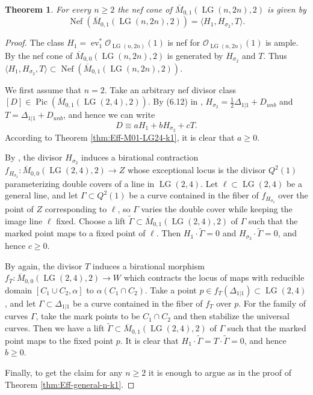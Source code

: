 \documentclass[10pt]{amsart}
\newtheorem{theorem}{Theorem}[section]
\theoremstyle{definition}
\newcommand{\OO}{\mathcal{O}}
\newcommand{\Pic}{\operatorname{Pic}}
\newcommand{\Nef}{\operatorname{Nef}}
\newcommand{\LG}{\operatorname{LG}}
\newcommand{\ev}{\operatorname{ev}}
\theoremstyle{plain} %
\begin{document}
\begin{theorem}\label{thm:nef-pointed-conics-LG}
For every $n\ge 2$ the nef cone of $\overline{M}_{0,1}(\LG(n,2n),2)$ is given by
\[
\operatorname{Nef}(\overline{M}_{0,1}(\LG(n,2n),2))
=
\langle H_1, H_{\sigma_2}, T\rangle.
\]
\end{theorem}
\begin{proof}
The class $H_1=\ev_1^*\OO_{\LG(n,2n)}(1)$ is nef for $\OO_{\LG(n,2n)}(1)$ is ample. By \cite[Proposition~6.11]{CM} the nef cone of $\overline{M}_{0,0}(\LG(n,2n),2)$ is generated by $H_{\sigma_2}$ and $T$. Thus $\langle H_1, H_{\sigma_2}, T\rangle \subset \Nef(\overline{M}_{0,1}(\LG(n,2n),2))$. 


We first assume that $n = 2$. Take an arbitrary nef divisor class $[D]\in\Pic(\overline{M}_{0,1}(\LG(2,4),2))$. By (6.12)
in \cite{CM}, $H_{\sigma_2}=\frac{1}{2}\Delta_{1|1}+D_{unb}$ and $T=\Delta_{1|1}+D_{unb}$, and hence we can write 
\begin{equation*}
    D\equiv aH_1+bH_{\sigma_2}+cT.
\end{equation*}
According to Theorem \ref{thm:Eff-M01-LG24-k1}, it is clear that $a\geq 0$.


By \cite[Proposition~6.11]{CM}, the divisor $H_{\sigma_2}$ induces a birational contraction $f_{H_{\sigma_2}}\colon\overline{M}_{0,0}(\LG(2,4),2)\rightarrow Z$ whose exceptional locus is the divisor $Q^2(1)$ parameterizing double covers of a line in $\LG(2,4)$.
Let $\ell\subset \LG(2,4)$ be a general line, and let $\Gamma\subset Q^2(1)$ be a curve contained in the fiber of
$f_{H_{\sigma_2}}$ over the point of $Z$ corresponding to $\ell$, so $\Gamma$ varies the double cover while keeping
the image line $\ell$ fixed. Choose a lift $\widetilde{\Gamma}\subset \overline{M}_{0,1}(\LG(2,4),2)$ of $\Gamma$ such that the marked point
maps to a fixed point of $\ell$. Then $H_1\cdot \widetilde{\Gamma}=0$ and $H_{\sigma_2}\cdot \widetilde{\Gamma}=0$, and hence $c\geq0$.

By \cite[Proposition~6.11]{CM} again, the divisor $T$ induces a birational morphism $f_{T}\colon\overline{M}_{0,0}(\LG(2,4),2)\rightarrow W$ which contracts the locus of maps with reducible 
domain $[C_1\cup C_2, \alpha]$ to $\alpha(C_1\cap C_2)$.
Take a point $p\in f_T(\Delta_{1|1})\subset \LG(2,4)$, and let $\Gamma\subset\Delta_{1|1}$ be a curve contained in the fiber of
$f_T$ over $p$. For the family of curves $\Gamma$,
take the mark points to be $C_1\cap C_2$ and then stabilize the universal curves. Then we have a lift $\widetilde{\Gamma}\subset \overline{M}_{0,1}(\LG(2,4),2)$ of $\Gamma$ such that the marked point
maps to the fixed point  $p$. It is clear that $H_1\cdot \widetilde{\Gamma}=T\cdot \widetilde{\Gamma}=0$, and hence $b\geq0$.


Finally, to get the claim for any $n\geq 2$ it is enough to argue as in the proof of Theorem \ref{thm:Eff-general-n-k1}.
\end{proof}
\end{document}
